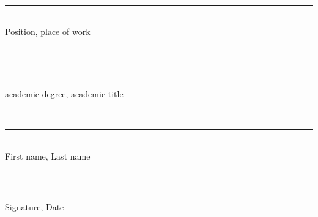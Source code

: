 \begin{titlepage}
\begin{minipage}[t]{0.42\textwidth}
\vspace{0.18cm}
\strut\hseCoSupervisorTitle\\[-0.05cm]
\rule{6.1cm}{0.4pt}\\[-0.05cm]
{\scriptsize Position, place of work}

\vspace{0.08cm}
\strut\hseCoSupervisorDegree\\[-0.05cm]
\rule{6.1cm}{0.4pt}\\[-0.05cm]
{\scriptsize academic degree, academic title}

\vspace{0.08cm}
\strut\hseCoSupervisorName\\[-0.05cm]
\rule{6.1cm}{0.4pt}\\[-0.05cm]
{\scriptsize First name, Last name}

\vspace{0.08cm}
\rule{3.6cm}{0.4pt}\quad\rule{2.2cm}{0.4pt}\\[-0.05cm]
{\scriptsize Signature, Date}
\end{minipage}
\hfill
\begin{minipage}[t]{0.42\textwidth}
\strut
\end{minipage}
\fi

\vfill

\begin{center}
\textbf{\hseCity{} \hseYear}
\end{center}
\end{titlepage}


\setcounter{page}{2}
\clearpage

